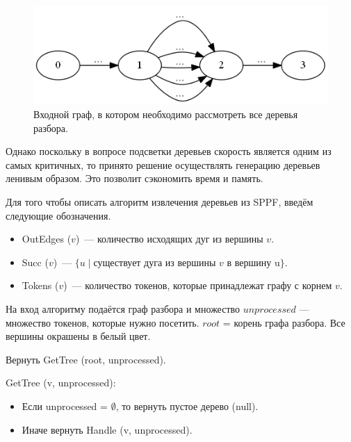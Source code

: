 \begin{figure}[t]
\centering
\includegraphics[width=\linewidth]{Ivanov/Pictures/Bad_case.png}
\caption{Входной граф, в котором необходимо рассмотреть все деревья разбора.}
\label{bad_case}
\end{figure}

Однако поскольку в вопросе подсветки деревьев скорость является одним из самых критичных, то принято решение осуществлять генерацию деревьев ленивым образом. Это позволит сэкономить время и память. 

Для того чтобы описать алгоритм извлечения деревьев из SPPF, введём следующие обозначения.
\begin{itemize}
\item OutEdges ($v$)~--- количество исходящих дуг из вершины $v$. 
\item Succ ($v$)~--- $\{u \mid \mbox{существует дуга из вершины } v \mbox{ в вершину u} \}$.
\item Tokens ($v$)~--- количество токенов, которые принадлежат графу с корнем $v$.
\end{itemize}

На вход алгоритму подаётся граф разбора и множество $unprocessed$ --- множество токенов, которые нужно посетить. $root$ = корень графа разбора. Все вершины окрашены в белый цвет. 

Вернуть GetTree (root, unprocessed).

GetTree (v, unprocessed):
\begin{itemize}
\item Если unprocessed = $\emptyset$, то вернуть пустое дерево (null).
\item Иначе вернуть Handle (v, unprocessed).
\end{itemize}

